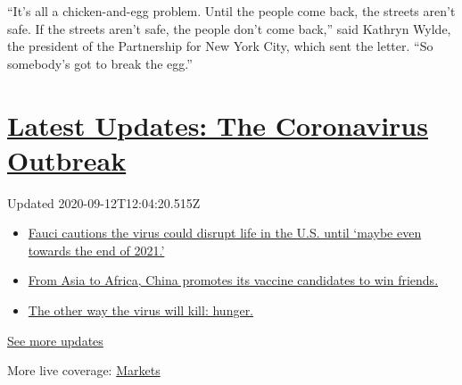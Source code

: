``It's all a chicken-and-egg problem. Until the people come back, the
streets aren't safe. If the streets aren't safe, the people don't come
back,'' said Kathryn Wylde, the president of the Partnership for New
York City, which sent the letter. ``So somebody's got to break the
egg.''

\hypertarget{latest-updates-the-coronavirus-outbreak}{%
\section{\texorpdfstring{\href{https://www.nytimes3xbfgragh.onion/2020/09/11/world/covid-19-coronavirus.html?action=click\&pgtype=Article\&state=default\&region=MAIN_CONTENT_1\&context=storylines_live_updates}{Latest
Updates: The Coronavirus
Outbreak}}{Latest Updates: The Coronavirus Outbreak}}\label{latest-updates-the-coronavirus-outbreak}}

Updated 2020-09-12T12:04:20.515Z

\begin{itemize}
\tightlist
\item
  \href{https://www.nytimes3xbfgragh.onion/2020/09/11/world/covid-19-coronavirus.html?action=click\&pgtype=Article\&state=default\&region=MAIN_CONTENT_1\&context=storylines_live_updates\#link-dfb8a16}{Fauci
  cautions the virus could disrupt life in the U.S. until `maybe even
  towards the end of 2021.'}
\item
  \href{https://www.nytimes3xbfgragh.onion/2020/09/11/world/covid-19-coronavirus.html?action=click\&pgtype=Article\&state=default\&region=MAIN_CONTENT_1\&context=storylines_live_updates\#link-7104d154}{From
  Asia to Africa, China promotes its vaccine candidates to win friends.}
\item
  \href{https://www.nytimes3xbfgragh.onion/2020/09/11/world/covid-19-coronavirus.html?action=click\&pgtype=Article\&state=default\&region=MAIN_CONTENT_1\&context=storylines_live_updates\#link-393ad215}{The
  other way the virus will kill: hunger.}
\end{itemize}

\href{https://www.nytimes3xbfgragh.onion/2020/09/11/world/covid-19-coronavirus.html?action=click\&pgtype=Article\&state=default\&region=MAIN_CONTENT_1\&context=storylines_live_updates}{See
more updates}

More live coverage:
\href{https://www.nytimes3xbfgragh.onion/live/2020/09/11/business/stock-market-today-coronavirus?action=click\&pgtype=Article\&state=default\&region=MAIN_CONTENT_1\&context=storylines_live_updates}{Markets}

